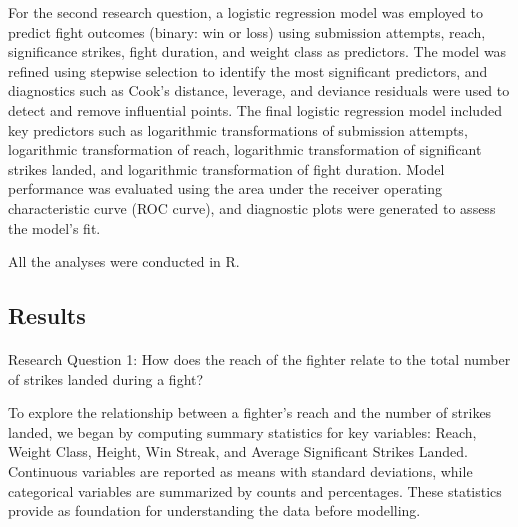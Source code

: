 \documentclass[
  letterpaper,
  DIV=11,
  numbers=noendperiod]{scrartcl}
\makeatletter
\let\oldparagraph\paragraph
\renewcommand{\paragraph}{
    \@ifstar
      \xxxParagraphStar
      \xxxParagraphNoStar
  }
\newcommand{\xxxParagraphStar}[1]{\oldparagraph*{#1}\mbox{}}
\newcommand{\xxxParagraphNoStar}[1]{\oldparagraph{#1}\mbox{}}
\makeatother
\begin{document}
For the second research question, a logistic regression model was
employed to predict fight outcomes (binary: win or loss) using
submission attempts, reach, significance strikes, fight duration, and
weight class as predictors. The model was refined using stepwise
selection to identify the most significant predictors, and diagnostics
such as Cook's distance, leverage, and deviance residuals were used to
detect and remove influential points. The final logistic regression
model included key predictors such as logarithmic transformations of
submission attempts, logarithmic transformation of reach, logarithmic
transformation of significant strikes landed, and logarithmic
transformation of fight duration. Model performance was evaluated using
the area under the receiver operating characteristic curve (ROC curve),
and diagnostic plots were generated to assess the model's fit.

All the analyses were conducted in R.

\subsection{Results}\label{results}

\paragraph{Research Question 1: How does the reach of the fighter relate
to the total number of strikes landed during a
fight?}\label{research-question-1-how-does-the-reach-of-the-fighter-relate-to-the-total-number-of-strikes-landed-during-a-fight}

To explore the relationship between a fighter's reach and the number of
strikes landed, we began by computing summary statistics for key
variables: Reach, Weight Class, Height, Win Streak, and Average
Significant Strikes Landed. Continuous variables are reported as means
with standard deviations, while categorical variables are summarized by
counts and percentages. These statistics provide as foundation for
understanding the data before modelling.
\end{document}

